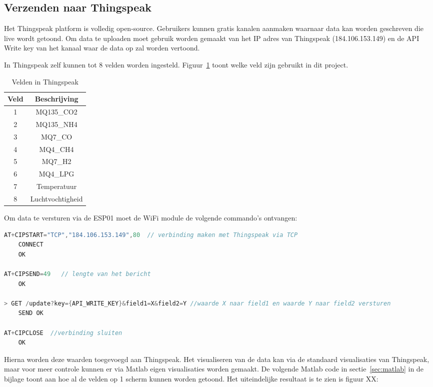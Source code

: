 \subsection{Verzenden naar Thingspeak}
\label{subsec:thingspeak}

Het Thingspeak platform is volledig open-source. Gebruikers kunnen gratis kanalen aanmaken waarnaar data kan worden geschreven die live wordt getoond. Om data te uploaden moet gebruik worden gemaakt van het IP adres van Thingspeak (184.106.153.149) en de API Write key van het kanaal waar de data op zal worden vertoond.

In Thingspeak zelf kunnen tot 8 velden worden ingesteld. Figuur~\ref{tab:velden} toont welke veld zijn gebruikt in dit project.
\begin{table}[htbp]
    \centering
    \begin{tabular}{|c|c|}
        \hline
        Veld & Beschrijving \\
        \hline
        1 & MQ135\_CO2 \\
        2 & MQ135\_NH4 \\
        3 & MQ7\_CO \\
        4 & MQ4\_CH4 \\
        5 & MQ7\_H2 \\
        6 & MQ4\_LPG \\
        7 & Temperatuur \\
        8 & Luchtvochtigheid \\
        \hline
    \end{tabular}
    \caption{Velden in Thingspeak}
    \label{tab:velden}
\end{table}

Om data te versturen via de ESP01 moet de WiFi module de volgende commando's ontvangen:
\begin{lstlisting}[language=Java,caption={ESP01 naar Thingspeak}]
AT+CIPSTART="TCP","184.106.153.149",80  // verbinding maken met Thingspeak via TCP
    CONNECT
    OK

AT+CIPSEND=49   // lengte van het bericht
    OK

> GET /update?key={API_WRITE_KEY}&field1=X&field2=Y //waarde X naar field1 en waarde Y naar field2 versturen
    SEND OK

AT+CIPCLOSE  //verbinding sluiten
    OK
\end{lstlisting}

Hierna worden deze waarden toegevoegd aan Thingspeak. Het visualiseren van de data kan via de standaard visualisaties van Thingspeak, maar voor meer controle kunnen er via Matlab
eigen visualisaties worden gemaakt. De volgende Matlab code in sectie~\ref{sec:matlab} in de bijlage toont aan hoe al de velden op 1 scherm kunnen worden getoond.
Het uiteindelijke resultaat is te zien is figuur XX:


